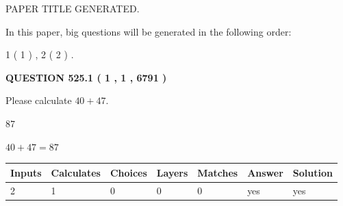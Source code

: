 \documentclass[12pt]{article}
\begin{document}
   
   
   
   
   
 \vspace{0.2in}
 
 
 
 
   
   
 PAPER TITLE GENERATED.
   
   
   
\vspace{0.2in}
   
In this paper, big questions will be generated in the following order: 
   
   
   1 ( 1 )
 ,
   2 ( 2 )
 .
  
\vspace{0.2in}
  
{\textbf{\Large{QUESTION
525.1 
 ( 1 , 1 , 6791 )
}}}
  
  
 
Please calculate $ %
40 +  %
47 $.
 
 
 
\noindent{}
 
 

87
 
 
\noindent{}
 
 

 
 
 
\noindent{}
 
 

$ %
40 +  %
47=   %
87$
 
 
\noindent{}
 
 

 
   
   
   
   
\noindent\begin{tabular}{|l|l|l|l|l|l|l|}
 \hline
Inputs & Calculates & Choices & Layers & Matches & Answer & Solution \\ \hline
 2  & 
 1  & 
 0
  & 
 0  & 
 0  & 
  yes & 
  yes 
  \\ \hline
 \end{tabular}
   
   
   
   
\noindent{}
   
\end{document}
